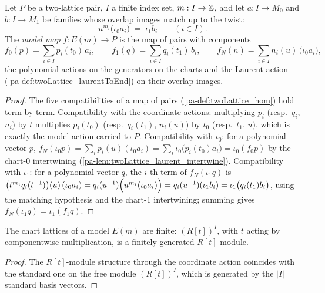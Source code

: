 \begin{definition}
  \label{pa-def:twoLattice_modelHom}
  \leanok

  Let \(P\) be a two-lattice pair, \(I\) a finite index set, \(m : I \to \mathbb{Z}\), and let
  \(a : I \to M_0\) and \(b : I \to M_1\) be families whose overlap images match up to
  the twist:
  \[
    u^{m_i}\bigl(\iota_0 a_i\bigr) \;=\; \iota_1 b_i \qquad (i \in I).
  \]
  The \emph{model map} \(f : E(m) \to P\) is the map of pairs with components
  \[
    f_0(p) = \sum_{i \in I} p_i(t_0)\, a_i, \qquad
    f_1(q) = \sum_{i \in I} q_i(t_1)\, b_i, \qquad
    f_N(n) = \sum_{i \in I} n_i(u)\, \bigl(\iota_0 a_i\bigr) ,
  \]
  the polynomial actions on the generators on the charts and the Laurent action
  (\ref{pa-def:twoLattice_laurentToEnd}) on their overlap images.
\end{definition}
\begin{proof}
  \leanok
  The five compatibilities of a map of pairs (\ref{pa-def:twoLattice_hom}) hold term by
  term. Compatibility with the coordinate actions: multiplying \(p_i\) (resp.\ \(q_i\),
  \(n_i\)) by \(t\) multiplies \(p_i(t_0)\) (resp.\ \(q_i(t_1)\), \(n_i(u)\)) by
  \(t_0\) (resp.\ \(t_1\), \(u\)), which is exactly the model action carried to \(P\).
  Compatibility with \(\iota_0\): for a polynomial vector \(p\),
  \(f_N(\iota_0 p) = \sum_i p_i(u)(\iota_0 a_i) = \sum_i \iota_0\bigl(p_i(t_0)a_i\bigr)
  = \iota_0(f_0 p)\) by the chart-0 intertwining
  (\ref{pa-lem:twoLattice_laurent_intertwine}). Compatibility with \(\iota_1\): for a
  polynomial vector \(q\), the \(i\)-th term of \(f_N(\iota_1 q)\) is
  \(\bigl(t^{m_i} q_i(t^{-1})\bigr)(u)\,(\iota_0 a_i) =
  q_i(u^{-1})\Bigl(u^{m_i}(\iota_0 a_i)\Bigr) = q_i(u^{-1})(\iota_1 b_i)
  = \iota_1\bigl(q_i(t_1) b_i\bigr)\), using the matching hypothesis and the chart-1
  intertwining; summing gives \(f_N(\iota_1 q) = \iota_1(f_1 q)\).
\end{proof}

\begin{lemma}
  \label{pa-lem:moduleFinite_aeval_model}
  \leanok

  The chart lattices of a model \(E(m)\) are finite: \((R[t])^I\), with \(t\) acting by
  componentwise multiplication, is a finitely generated \(R[t]\)-module.
\end{lemma}
\begin{proof}
  \leanok
  The \(R[t]\)-module structure through the coordinate action coincides with the
  standard one on the free module \((R[t])^I\), which is generated by the \(|I|\)
  standard basis vectors.
\end{proof}

